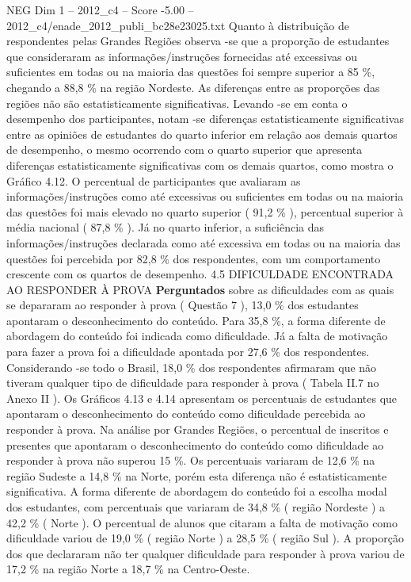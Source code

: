 \begin{textsample}{NEG Dim 1 – 2012\_c4 – Score -5.00 – 2012\_c4/enade\_2012\_publi\_bc28e23025.txt}
Quanto à distribuição de respondentes pelas Grandes Regiões observa -se que a proporção de estudantes que consideraram as informações/instruções fornecidas até excessivas ou suficientes em todas ou na maioria das questões foi sempre superior a 85 \%, chegando a 88,8 \% na região Nordeste.
As diferenças entre as proporções das regiões não são estatisticamente significativas.
Levando -se em conta o desempenho dos participantes, notam -se diferenças estatisticamente significativas entre as opiniões de estudantes do quarto inferior em relação aos demais quartos de desempenho, o mesmo ocorrendo com o quarto superior que apresenta diferenças estatisticamente significativas com os demais quartos, como mostra o Gráfico 4.12.
O percentual de participantes que avaliaram as informações/instruções como até excessivas ou suficientes em todas ou na maioria das questões foi mais elevado no quarto superior ( 91,2 \% ), percentual superior à média nacional ( 87,8 \% ).
Já no quarto inferior, a suficiência das informações/instruções declarada como até excessiva em todas ou na maioria das questões foi percebida por 82,8 \% dos respondentes, com um comportamento crescente com os quartos de desempenho. 4.5 DIFICULDADE ENCONTRADA AO RESPONDER À PROVA \textbf{Perguntados} sobre as dificuldades com as quais se depararam ao responder à prova ( Questão 7 ), 13,0 \% dos estudantes apontaram o desconhecimento do conteúdo.
Para 35,8 \%, a forma diferente de abordagem do conteúdo foi indicada como dificuldade.
Já a falta de motivação para fazer a prova foi a dificuldade apontada por 27,6 \% dos respondentes.
Considerando -se todo o Brasil, 18,0 \% dos respondentes afirmaram que não tiveram qualquer tipo de dificuldade para responder à prova ( Tabela II.7 no Anexo II ).
Os Gráficos 4.13 e 4.14 apresentam os percentuais de estudantes que apontaram o desconhecimento do conteúdo como dificuldade percebida ao responder à prova.
Na análise por Grandes Regiões, o percentual de inscritos e presentes que apontaram o desconhecimento do conteúdo como dificuldade ao responder à prova não superou 15 \%.
Os percentuais variaram de 12,6 \% na região Sudeste a 14,8 \% na Norte, porém esta diferença não é estatisticamente significativa.
A forma diferente de abordagem do conteúdo foi a escolha modal dos estudantes, com percentuais que variaram de 34,8 \% ( região Nordeste ) a 42,2 \% ( Norte ).
O percentual de alunos que citaram a falta de motivação como dificuldade variou de 19,0 \% ( região Norte ) a 28,5 \% ( região Sul ).
A proporção dos que declararam não ter qualquer dificuldade para responder à prova variou de 17,2 \% na região Norte a 18,7 \% na Centro-Oeste.

\end{textsample}
